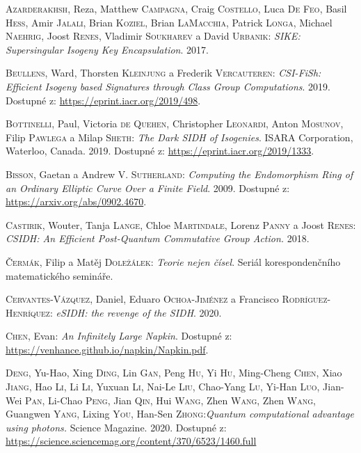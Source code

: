 \documentclass[12pt]{report}
\begin{document}
\begin{thebibliography}{97}

\textsc{Azarderakhsh}, Reza, Matthew \textsc{Campagna}, Craig \textsc{Costello}, Luca \textsc{De Feo}, Basil \textsc{Hess}, Amir \textsc{Jalali}, Brian \textsc{Koziel}, Brian \textsc{LaMacchia}, Patrick \textsc{Longa}, Michael \textsc{Naehrig}, Joost \textsc{Renes}, Vladimir \textsc{Soukharev} a David \textsc{Urbanik}: \textit{SIKE: Supersingular Isogeny Key Encapsulation}. 2017.

\textsc{Beullens}, Ward, Thorsten \textsc{Kleinjung} a Frederik \textsc{Vercauteren}: \textit{CSI-FiSh: Efficient Isogeny based Signatures through Class Group Computations}. 2019. Dostupné z: \url{https://eprint.iacr.org/2019/498}.

\textsc{Bottinelli}, Paul, Victoria \textsc{de Quehen}, Christopher \textsc{Leonardi}, Anton \textsc{Mosunov}, Filip \textsc{Pawlega} a Milap \textsc{Sheth}: \textit{The Dark SIDH of Isogenies}. ISARA Corporation, Waterloo, Canada. 2019. Dostupné z: \url{https://eprint.iacr.org/2019/1333}.


\textsc{Bisson}, Gaetan a Andrew V. \textsc{Sutherland}: \textit{Computing the Endomorphism Ring of an Ordinary Elliptic Curve Over a Finite Field}. 2009. Dostupné z: \url{https://arxiv.org/abs/0902.4670}.

\textsc{Castirik}, Wouter, Tanja \textsc{Lange}, Chloe \textsc{Martindale}, Lorenz \textsc{Panny} a Joost \textsc{Renes}: \textit{CSIDH: An Efficient Post-Quantum Commutative Group Action.} 2018.

\textsc{Čermák}, Filip a Matěj \textsc{Doležálek}: \textit{Teorie nejen čísel}. Seriál korespondenčního matematického semináře.

\textsc{Cervantes-Vázquez}, Daniel, Eduaro \textsc{Ochoa-Jiménez} a Francisco \textsc{Rodríguez-Henríquez}: \textit{eSIDH: the revenge of the SIDH}. 2020.

\textsc{Chen}, Evan: \textit{An Infinitely Large Napkin}. Dostupné z: \url{https://venhance.github.io/napkin/Napkin.pdf}.

\textsc{Deng}, Yu-Hao, Xing \textsc{Ding}, Lin \textsc{Gan}, Peng \textsc{Hu}, Yi \textsc{Hu}, Ming-Cheng \textsc{Chen}, Xiao \textsc{Jiang}, Hao \textsc{Li}, Li \textsc{Li}, Yuxuan \textsc{Li}, Nai-Le \textsc{Liu}, Chao-Yang \textsc{Lu}, Yi-Han \textsc{Luo}, Jian-Wei \textsc{Pan}, Li-Chao \textsc{Peng}, Jian \textsc{Qin}, Hui \textsc{Wang}, Zhen \textsc{Wang}, Zhen \textsc{Wang}, Guangwen \textsc{Yang}, Lixing \textsc{You}, Han-Sen \textsc{Zhong}:\textit{Quantum computational advantage using photons.} Science Magazine. 2020. Dostupné z: \url{https://science.sciencemag.org/content/370/6523/1460.full}


\end{thebibliography}
\end{document}
